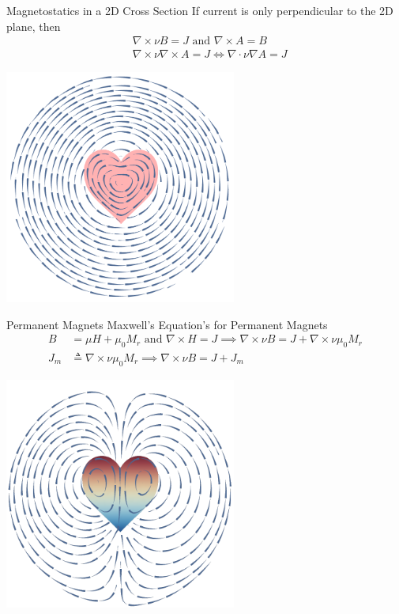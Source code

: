 \documentclass{beamer}
\begin{document}
    \begin{frame}{Magnetostatics in a 2D Cross Section}
        If current is only perpendicular to the 2D plane, then
        \begin{align*}
            &\nabla\times \nu B=J\text{ and }\nabla \times A = B\\
            &\nabla\times \nu \nabla\times A=J \iff \nabla\cdot \nu \nabla A=J
        \end{align*}
        \begin{center}
            \includegraphics[width=3in]{heartwire.pdf}
        \end{center}
    \end{frame}
    \begin{frame}{Permanent Magnets}
        Maxwell's Equation's for Permanent Magnets
        \begin{align*}
            B &= \mu H +\mu_0 M_r\text{ and } \nabla \times H = J \implies \nabla \times \nu B=J+\nabla\times \nu\mu_0 M_r\\
            J_m&\triangleq \nabla\times \nu\mu_0 M_r \implies \nabla \times \nu B=J+J_m
        \end{align*}
        \begin{center}
            \includegraphics[width=3in]{heartmag.pdf}
        \end{center}
    \end{frame}
\end{document}
